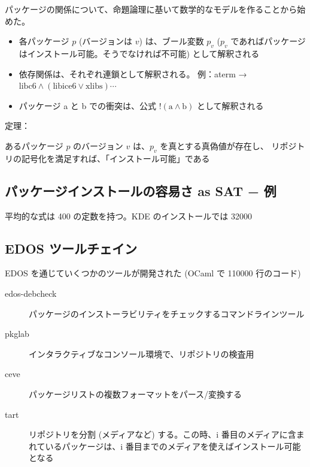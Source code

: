 \documentclass[mingoth,a4paper]{jsarticle}
\begin{document}
パッケージの関係について、命題論理に基いて数学的なモデルを作ることから始めた。

\begin{itemize}
\item 各パッケージ $p$ (バージョンは $v$) は、ブール変数 $p_v$ 
      ($p_v$ であればパッケージはインストール可能。そうでなければ不可能) 
      として解釈される
    \item 依存関係は、それぞれ連鎖として解釈される。
          例：aterm →
          $\mathrm{libc6}\wedge(\mathrm{libice6}\lor\mathrm{xlibs}) \cdots$
\item パッケージ a と b での衝突は、公式 $!(\mathrm{a}\wedge\mathrm{b})$
      として解釈される
\end{itemize}

定理：

あるパッケージ $p$ のバージョン $v$ は、$p_v$ を真とする真偽値が存在し、
リポジトリの記号化を満足すれば、「インストール可能」である


\subsection{パッケージインストールの容易さ as SAT − 例}


平均的な式は 400 の定数を持つ。KDE のインストールでは 32000


\subsection{EDOS ツールチェイン}

EDOS を通じていくつかのツールが開発された (OCaml で 110000 行のコード)

\begin{description}
\item[edos-debcheck] \mbox{}

パッケージのインストーラビリティをチェックするコマンドラインツール
\item[pkglab] \mbox{}

インタラクティブなコンソール環境で、リポジトリの検査用
\item[ceve] \mbox{}

パッケージリストの複数フォーマットをパース/変換する
\item[tart] \mbox{}

リポジトリを分割 (メディアなど) する。この時、i 番目のメディアに含まれているパッケージは、i 番目までのメディアを使えばインストール可能となる
\end{description}
\end{document}
